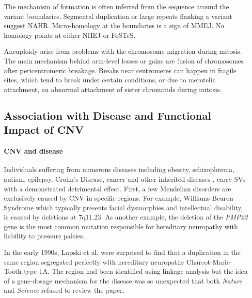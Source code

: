 The mechanism of formation is often inferred from the sequence around the variant boundaries\cite{Mills2011}.
Segmental duplication or large repeats flanking a variant suggest NAHR.
Micro-homology at the boundaries is a sign of MMEJ.
No homology points at either NHEJ or FoSTeS.

Aneuploidy arise from problems with the chromosome migration during mitosis.
The main mechanism behind arm-level losses or gains are fusion of chromosomes after pericentromeric breakage.
Breaks near centromeres can happen in fragile sites, which tend to break under certain conditions, or due to merotelic attachment, an abnormal attachment of sister chromatids during mitosis\cite{Martinez-A2011}.

\subsection{Association with Disease and Functional Impact of CNV}

\paragraph{CNV and disease}

Individuals suffering from numerous diseases including obesity\cite{Bochukova2010}, schizophrenia\cite{Stone2008}, autism\cite{Stefansson2014}, epilepsy\cite{Mefford2011}, Crohn's Disease\cite{McCarroll2008a}, cancer\cite{Beroukhim2010} and other inherited diseases \cite{Balzola2010,Ayarpadikannan2014}, carry SVs with a demonstrated detrimental effect\cite{Conrad2010,Firth2009,Spielmann2013}.
First, a few Mendelian disorders are exclusively caused by CNV in specific regions.
For example, Williams-Beuren Syndrome which typically presents facial dysmorphies and intellectual disability, is caused by deletions at 7q11.23.
As another example, the deletion of the {\it PMP22} gene is the most common mutation responsible for hereditary neuropathy with liability to pressure palsies.
\begin{comment}
  {\it PMP22} protein is a component of myelin, a substance that protects nerves, and seem to be specifically responsible to protecting nerves from physical pressure.
\end{comment}
In the early 1990s, Lupski et al. were surprised to find that a duplication in the same region segregated perfectly with hereditary neuropathy Charcot-Marie-Tooth type 1A\cite{Lupski1991}.
The region had been identified using linkage analysis but the idea of a gene-dosage mechanism for the disease was so unexpected that both {\it Nature} and {\it Science} refused to review the paper.


